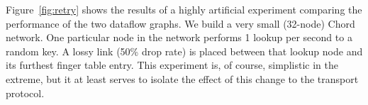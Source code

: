 \documentclass[10pt,twocolumn]{article}
\newcommand{\note}[1]{}
\begin{document}


Figure~\ref{fig:retry} shows the results of a highly artificial
experiment comparing the performance of the two dataflow graphs.  We
build a very small (32-node) Chord network.  One 
particular node in the network performs 1 lookup per second to a
random key.  A lossy link (50\% drop rate) is placed between that lookup node and its
furthest finger table entry.
This experiment is, of course, simplistic in the extreme, but it
at least serves to isolate the effect of this change to the transport
protocol.
\end{document}

